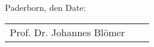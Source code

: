 \vspace*{.5cm}
\ifgerman
Paderborn, den
\else
Date:
\fi
\vspace*{1cm}
\begin{center}
	\begin{tabular}{l p{} r}
	  \cline{1-1} \cline{3-3}
	  \begin{minipage}[t]{0.4\textwidth}
	    \centering
	    Prof. Dr. Johannes Blömer
		\end{minipage}
		&
		\begin{minipage}[t]{0.2\textwidth}
		\end{minipage}
		&
		\begin{minipage}[t]{0.4\textwidth}
		  \centering
		  \Author
		\end{minipage}
	\end{tabular}
\end{center}

